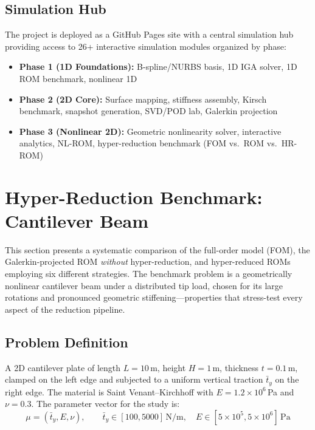 \subsection{Simulation Hub}

The project is deployed as a GitHub Pages site with a central simulation hub providing access to 26+ interactive simulation modules organized by phase:

\begin{itemize}
    \item \textbf{Phase 1 (1D Foundations):} B-spline/NURBS basis, 1D IGA solver, 1D ROM benchmark, nonlinear 1D
    \item \textbf{Phase 2 (2D Core):} Surface mapping, stiffness assembly, Kirsch benchmark, snapshot generation, SVD/POD lab, Galerkin projection
    \item \textbf{Phase 3 (Nonlinear 2D):} Geometric nonlinearity solver, interactive analytics, NL-ROM, hyper-reduction benchmark (FOM vs.\ ROM vs.\ HR-ROM)
\end{itemize}

\section{Hyper-Reduction Benchmark: Cantilever Beam}
\label{sec:hyperreduction-benchmark}

This section presents a systematic comparison of the full-order model (FOM), the Galerkin-projected ROM \emph{without} hyper-reduction, and hyper-reduced ROMs employing six different strategies. The benchmark problem is a geometrically nonlinear cantilever beam under a distributed tip load, chosen for its large rotations and pronounced geometric stiffening—properties that stress-test every aspect of the reduction pipeline.

\subsection{Problem Definition}

A 2D cantilever plate of length $L = 10$\,m, height $H = 1$\,m, thickness $t = 0.1$\,m, clamped on the left edge and subjected to a uniform vertical traction $\bar{t}_y$ on the right edge. The material is Saint Venant--Kirchhoff with $E = 1.2 \times 10^6$\,Pa and $\nu = 0.3$. The parameter vector for the study is:
\begin{equation}
    \mu = (\bar{t}_y, E, \nu), \qquad \bar{t}_y \in [100, 5000]\,\text{N/m}, \quad E \in [5 \times 10^5, 5 \times 10^6]\,\text{Pa}
\end{equation}

